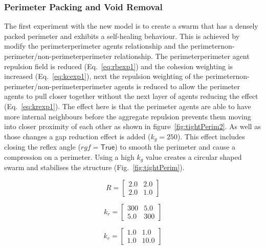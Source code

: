 \documentclass[12pt,a4paper]{IEEEtran}
\newcommand{\kc}{\mathit{k_c}}
\newcommand{\kr}{\mathit{k_r}}
\newcommand{\kg}{\mathit{k_g}}
\newcommand{\rb}{\mathit{R}}
\newcommand{\rgf}{\mathit{rgf}}
\begin{document}
\subsubsection{Perimeter Packing and Void Removal}\label{sec:perimCompress}

The first experiment with the new model is to create a swarm that has a densely packed perimeter and exhibits a self-healing behaviour. This is achieved by modify the perimeter\textrightarrow perimeter agents relationship and the perimeter\textrightarrow non-perimeter/non-perimeter\textrightarrow perimeter relationship. The perimeter\textrightarrow perimeter agent repulsion field is reduced (Eq.~\ref{eq:rbexp1}) and the cohesion weighting is increased (Eq.~\ref{eq:kcexp1}), next the repulsion weighting of the  perimeter\textrightarrow non-perimeter/non-perimeter\textrightarrow perimeter agents is reduced to allow the perimeter agents to pull closer together without the next layer of agents reducing the effect (Eq.~\ref{eq:krexp1}). The effect here is that the perimeter agents are able to have more internal neighbours before the aggregate repulsion prevents them moving into closer proximity of each other as shown in figure~\ref{fig:tightPerim2}. As well as those changes a gap reduction effect is added ($\kg=250$). This effect includes closing the reflex angle ($\rgf=\mathsf{True}$) to smooth the perimeter and cause a  compression on a perimeter. Using a high $\kg$ value creates a circular shaped swarm and stabilises the structure (Fig.~\ref{fig:tightPerim}).

\begin{equation}\label{eq:rbexp1}
\rb = 
\begin{bmatrix}
2.0 & 2.0\\
2.0 & 1.0
\end{bmatrix}
\end{equation}

\begin{equation}\label{eq:krexp1}
\kr = 
\begin{bmatrix}
300 & 5.0\\
5.0 & 300
\end{bmatrix}
\end{equation}

\begin{equation}\label{eq:kcexp1}
\kc = 
\begin{bmatrix}
1.0 & 1.0\\
1.0 & 10.0
\end{bmatrix}
\end{equation}
\end{document}
